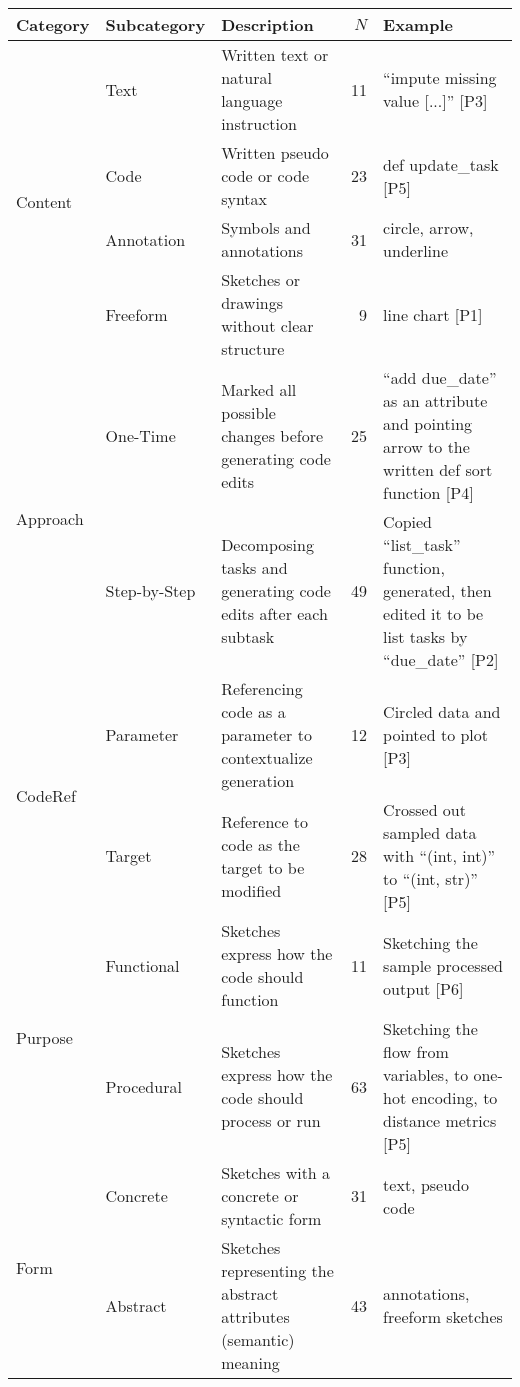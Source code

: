 \small
\begin{tabular}[t]{l|lp{6.1cm}rp{6.2cm}}
\toprule
\textbf{Category} & \textbf{Subcategory} & \textbf{Description} & $N$ & \textbf{Example} \\
\midrule
\multirow[t]{4}{*}{Content} 
    & Text        & Written text or natural language instruction & 11 & ``impute missing value [...]'' [P3] \\
    & Code        & Written pseudo code or code syntax & 23 & def update\_task [P5] \\
    & Annotation  & Symbols and annotations & 31 & circle, arrow, underline \\
    & Freeform    & Sketches or drawings without clear structure & 9  & line chart [P1] \\
\midrule
\multirow[t]{2}{*}{Approach} 
    & One-Time    & Marked all possible changes before generating code edits & 25 & ``add due\_date'' as an attribute and pointing arrow to the written def sort function [P4] \\
    & Step-by-Step & Decomposing tasks and generating code edits after each subtask & 49 & Copied ``list\_task'' function, generated, then edited it to be list tasks by ``due\_date'' [P2] \\
\midrule
\multirow[t]{2}{*}{CodeRef} 
    & Parameter   & Referencing code as a parameter to contextualize generation & 12 & Circled data and pointed to plot [P3] \\
    & Target      & Reference to code as the target to be modified & 28 & Crossed out sampled data with ``(int, int)'' to ``(int, str)'' [P5] \\
\midrule
\multirow[t]{2}{*}{Purpose} 
    & Functional  & Sketches express how the code should function & 11 & Sketching the sample processed out\-put [P6] \\
    & Procedural  & Sketches express how the code should process or run & 63 & Sketching the flow from variables, to one-hot encoding, to distance metrics [P5] \\
\midrule
\multirow[t]{2}{*}{Form} 
    & Concrete    & Sketches with a concrete or syntactic form & 31 & text, pseudo code \\
    & Abstract    & Sketches representing the abstract attributes (semantic) meaning & 43 & annotations, freeform sketches \\
\bottomrule
\end{tabular}